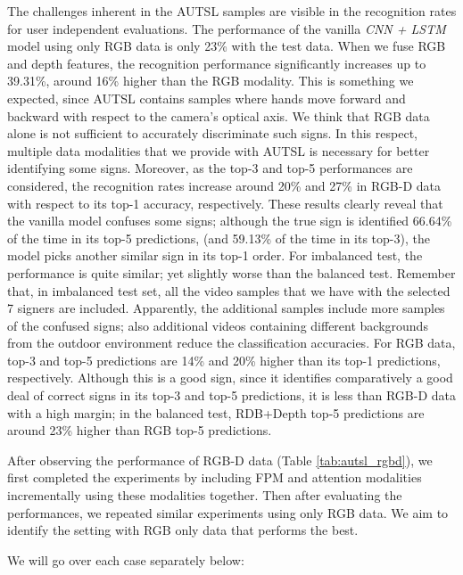 \documentclass[11pt, a4paper, singlecolumn]{article}
\begin{document}
The challenges inherent in the AUTSL samples are visible in the recognition rates for user independent evaluations. The performance of the vanilla \textit{CNN + LSTM} model using only RGB data is only 23\% with the test data. When we fuse RGB and depth features, the recognition performance significantly increases up to 39.31\%, around 16\% higher than the RGB modality. This is something we expected, since AUTSL contains samples where hands move forward and backward with respect to the camera's optical axis. We think that RGB data alone is not sufficient to accurately discriminate such signs. In this respect, multiple data modalities that we provide with AUTSL is necessary for better identifying some signs. Moreover, as the top-3 and top-5 performances are considered, the recognition rates increase around 20\% and 27\% in RGB-D data with respect to its top-1 accuracy, respectively. These results clearly reveal that the vanilla model confuses some signs; although the true sign is identified 66.64\% of the time in its top-5 predictions, (and 59.13\% of the time in its top-3), the model picks another similar sign in its top-1 order. For imbalanced test, the performance is quite similar; yet slightly worse than the balanced test. Remember that, in imbalanced test set, all the video samples that we have with the selected 7 signers are included. Apparently, the additional samples include more samples of the confused signs; also additional videos containing different backgrounds from the outdoor environment reduce the classification accuracies. For RGB data, top-3 and top-5 predictions are 14\% and 20\% higher than its top-1 predictions, respectively. Although this is a good sign, since it identifies comparatively a good deal of correct signs in its top-3 and top-5 predictions, it is less than RGB-D data with a high margin; in the balanced test, RDB+Depth top-5 predictions are around 23\% higher than RGB top-5 predictions. 

After observing the performance of RGB-D data (Table \ref{tab:autsl_rgbd}), we first completed the experiments by including FPM and attention modalities incrementally using these modalities together. Then after evaluating the performances, we repeated similar experiments using only RGB data. We aim to identify the setting with RGB only data that performs the best. 

We will go over each case separately below:
\end{document}
